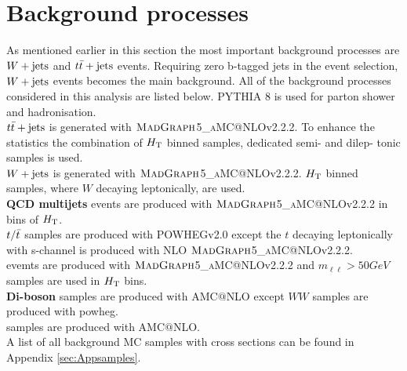 \section{Background processes}
\label{sec:bkg_proc}
As mentioned earlier in this section the most important background processes are $W+\textrm{jets}$ and $t\bar{t}+\textrm{jets}$ events. Requiring zero b-tagged jets in the event selection, $W+\textrm{jets}$ events becomes the main background. All of the background processes considered in this analysis are listed below. PYTHIA 8 is used for parton shower and hadronisation. \\
{\boldmath $t\bar{t}+\textrm{jets}$} is generated with $\textsc{MadGraph}$5\_\textsc{aMC@}NLOv2.2.2. To enhance the statistics the combination of $H_{\rm T}$ binned samples, dedicated semi- and dilep- tonic samples is used.\\
{\boldmath $W+\textrm{jets}$} is generated with $\textsc{MadGraph}$5\_\textsc{aMC@}NLOv2.2.2. $H_{\rm T}$ binned samples, where $W$ decaying leptonically, are used.\\
\textbf{QCD multijets} events are produced with $\textsc{MadGraph}$5\_\textsc{aMC@}NLOv2.2.2 in bins of $H_{\rm T}$.\\
{\boldmath $t/\bar{t}$} samples are produced with POWHEGv2.0 except the $t$ decaying leptonically with s-channel is produced with NLO $\textsc{MadGraph}$5\_\textsc{aMC@}NLOv2.2.2. \\
\textbf{\DY} evemts are produced with $\textsc{MadGraph}$5\_\textsc{aMC@}NLOv2.2.2 and $m_{\ell\ell}>50 GeV$ samples are used in $H_{\rm T}$ bins.\\
\textbf{Di-boson} samples are produced with AMC$@$NLO except $WW$ samples are produced with powheg.\\
{\boldmath \TTVH} samples are produced with  AMC$@$NLO.\\
A list of all background MC samples with cross sections can be found in Appendix \ref{sec:Appsamples}.
